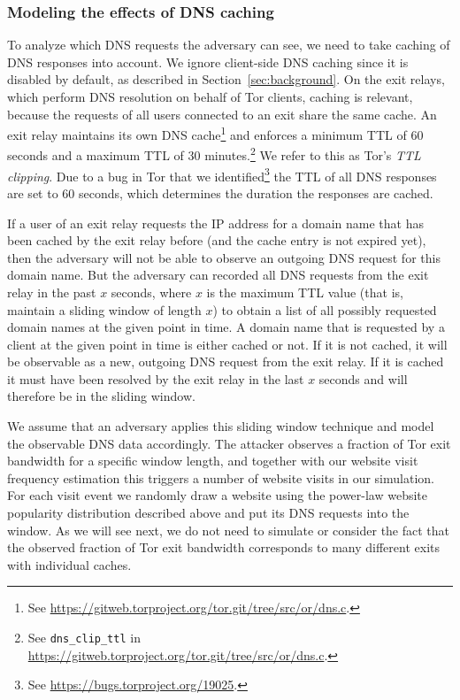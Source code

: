 \subsubsection{Modeling the effects of DNS caching}
To analyze which DNS requests the adversary can see, we need to
take caching of DNS responses into account. We ignore client-side DNS
caching since it is disabled by default, as described in
Section~\ref{sec:background}.
On the exit relays, which perform DNS resolution on behalf of Tor clients, caching
is relevant, because the requests of all users connected to an exit
share the same cache. An exit
relay maintains its own DNS cache\footnote{See
\url{https://gitweb.torproject.org/tor.git/tree/src/or/dns.c}.} and enforces a
minimum TTL of 60 seconds and a maximum TTL of 30 minutes.\footnote{See
\texttt{dns\_clip\_ttl} in
\url{https://gitweb.torproject.org/tor.git/tree/src/or/dns.c}.}  We
refer to this as Tor's \emph{TTL clipping}. Due to a
bug in Tor that we identified\footnote{See \url{https://bugs.torproject.org/19025}.}
the TTL of all DNS responses are set to 60 seconds, which determines
the duration the responses are cached.

If a user of an exit relay requests the IP address for a domain name
that has been cached by the exit relay before (and the cache entry is
not expired yet), then the adversary will not be able to observe an
outgoing DNS request for this domain name. But the adversary can
recorded all DNS requests from the exit relay in the past $x$ seconds,
where $x$ is the maximum TTL value (that is, maintain a sliding window of
length $x$) to obtain a list of all possibly requested domain names at the
given point in time. A domain name that is requested by a client at the
given point in time is either cached or not. If it is
not cached, it will be observable as a new, outgoing DNS
request from the exit relay. If it is cached it must
have been resolved by the exit relay in the last $x$ seconds and will
therefore be in the sliding window.

We assume that an adversary applies this sliding window technique and
model the observable DNS data accordingly.
The attacker observes a fraction of Tor exit bandwidth
for a specific window length,
and together with our website visit frequency estimation
this triggers a number of website visits in our simulation.
For each visit event we randomly draw a website using the
power-law website popularity distribution described above and put its
DNS requests into the window. As we will see next, we do not need to
simulate or consider the fact that the observed fraction of Tor exit bandwidth
corresponds to many different exits with individual caches.

